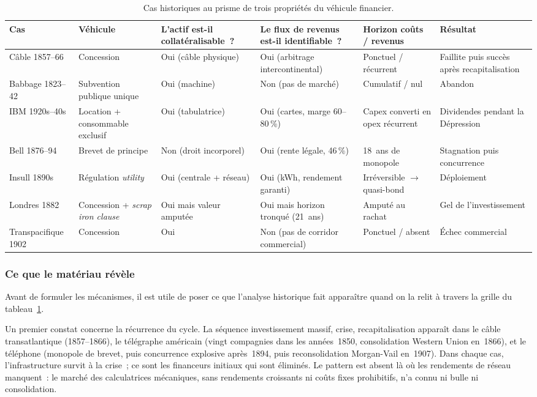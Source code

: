 \begin{table}[!ht]
\caption{Cas historiques au prisme de trois propriétés du véhicule financier.}\label{tab:d8-vehicules}
\centering\footnotesize
\renewcommand{\arraystretch}{1.35}
\begin{tabularx}{\textwidth}{@{}p{2.0cm}p{2.8cm}p{2.0cm}p{2.0cm}p{2.0cm}X@{}}
\toprule
\textbf{Cas} & \textbf{Véhicule} & \textbf{L'actif est-il collatéralisable~?} & \textbf{Le flux de revenus est-il identifiable~?} & \textbf{Horizon coûts / revenus} & \textbf{Résultat} \\
\midrule
Câble 1857--66 & Concession & Oui (câble physique) & Oui (arbitrage intercontinental) & Ponctuel / récurrent & Faillite puis succès après recapitalisation \\
Babbage 1823--42 & Subvention publique unique & Oui (machine) & Non (pas de marché) & Cumulatif / nul & Abandon \\
IBM 1920s--40s & Location + consommable exclusif & Oui (tabulatrice) & Oui (cartes, marge 60--80\,\%) & Capex converti en opex récurrent & Dividendes pendant la Dépression \\
Bell 1876--94 & Brevet de principe & Non (droit incorporel) & Oui (rente légale, 46\,\%) & 18~ans de monopole & Stagnation puis concurrence \\
Insull 1890s & Régulation \emph{utility} & Oui (centrale + réseau) & Oui (kWh, rendement garanti) & Irréversible $\to$ quasi-bond & Déploiement \\
Londres 1882 & Concession + \emph{scrap iron clause} & Oui mais valeur amputée & Oui mais horizon tronqué (21~ans) & Amputé au rachat & Gel de l'investissement \\
Transpacifique 1902 & Concession & Oui & Non (pas de corridor commercial) & Ponctuel / absent & Échec commercial \\
\bottomrule
\end{tabularx}
\renewcommand{\arraystretch}{1.0}
\end{table}


\subsubsection{Ce que le matériau révèle}

Avant de formuler les mécanismes, il est utile de poser ce que l'analyse historique fait apparaître quand on la relit à travers la grille du tableau~\ref{tab:d8-vehicules}.

Un premier constat concerne la récurrence du cycle. La séquence investissement massif, crise, recapitalisation apparaît dans le câble transatlantique (1857--1866), le télégraphe américain (vingt compagnies dans les années~1850, consolidation Western Union en~1866), et le téléphone (monopole de brevet, puis concurrence explosive après~1894, puis reconsolidation Morgan-Vail en~1907). Dans chaque cas, l'infrastructure survit à la crise~; ce sont les financeurs initiaux qui sont éliminés. Le pattern est absent là où les rendements de réseau manquent~: le marché des calculatrices mécaniques, sans rendements croissants ni coûts fixes prohibitifs, n'a connu ni bulle ni consolidation.

